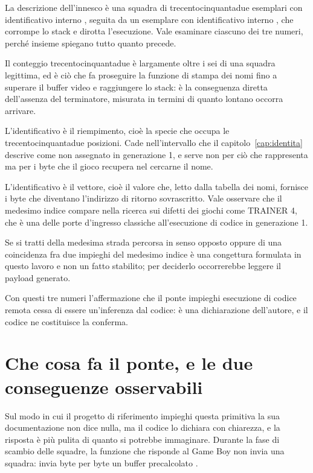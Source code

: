 La descrizione dell'innesco è una squadra di trecentocinquantadue esemplari con identificativo interno , seguita da un esemplare con identificativo interno , che corrompe lo stack e dirotta l'esecuzione. Vale esaminare ciascuno dei tre numeri, perché insieme spiegano tutto quanto precede.

Il conteggio trecentocinquantadue è largamente oltre i sei di una squadra legittima, ed è ciò che fa proseguire la funzione di stampa dei nomi fino a superare il buffer video e raggiungere lo stack: è la conseguenza diretta dell'assenza del terminatore, misurata in termini di quanto lontano occorra arrivare.

L'identificativo  è il riempimento, cioè la specie che occupa le trecentocinquantadue posizioni. Cade nell'intervallo che il capitolo~\ref{cap:identita} descrive come non assegnato in generazione 1, e serve non per ciò che rappresenta ma per i byte che il gioco recupera nel cercarne il nome.

L'identificativo  è il vettore, cioè il valore che, letto dalla tabella dei nomi, fornisce i byte che diventano l'indirizzo di ritorno sovrascritto. Vale osservare che il medesimo indice compare nella ricerca sui difetti dei giochi come TRAINER 4, che è una delle porte d'ingresso classiche all'esecuzione di codice in generazione 1.

\begin{daverificare}
Se si tratti della medesima strada percorsa in senso opposto oppure di una coincidenza fra due impieghi del medesimo indice è una congettura formulata in questo lavoro e non un fatto stabilito; per deciderlo occorrerebbe leggere il payload generato.
\end{daverificare}

Con questi tre numeri l'affermazione che il ponte impieghi esecuzione di codice remota cessa di essere un'inferenza dal codice: è una dichiarazione dell'autore, e il codice ne costituisce la conferma.

\section{Che cosa fa il ponte, e le due conseguenze osservabili}

Sul modo in cui il progetto di riferimento impieghi questa primitiva la sua documentazione non dice nulla, ma il codice lo dichiara con chiarezza, e la risposta è più pulita di quanto si potrebbe immaginare. Durante la fase di scambio delle squadre, la funzione che risponde al Game Boy non invia una squadra: invia byte per byte un buffer precalcolato \cite{ptgb}.


